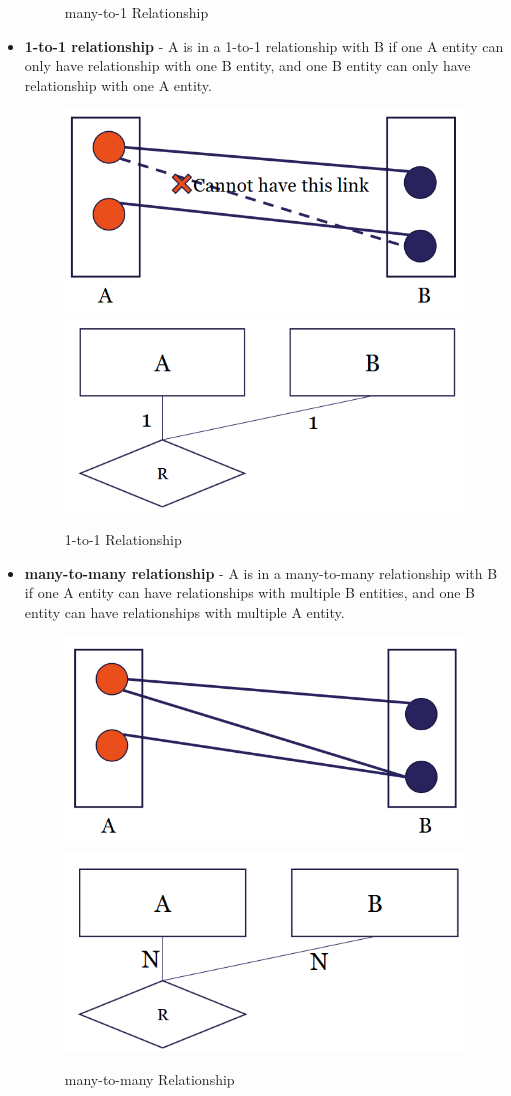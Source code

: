 \begin{itemize}
\begin{figure}[H]
\label{many-to-1}
\caption{many-to-1 Relationship}
\end{figure}
\item \textbf{1-to-1 relationship} - A is in a 1-to-1 relationship with B if one A entity can only have relationship with one B entity, and one B entity can only have relationship with one A entity.
\begin{figure}[H]
\centering
\includegraphics[width=.45\textwidth]{images/one-to-one1.PNG}
\includegraphics[width=.5\textwidth]{images/one-to-one2.PNG}
\label{1-to-1}
\caption{1-to-1 Relationship}
\end{figure}
\item \textbf{many-to-many relationship} - A is in a many-to-many relationship with B if one A entity can have relationships with multiple B entities, and one B entity can have relationships with multiple A entity.
\begin{figure}[H]
\centering
\includegraphics[width=.45\textwidth]{images/many-to-many1.PNG}
\includegraphics[width=.5\textwidth]{images/many-to-many2.PNG}
\label{many-to-many}
\caption{many-to-many Relationship}
\end{figure}
\end{itemize}
